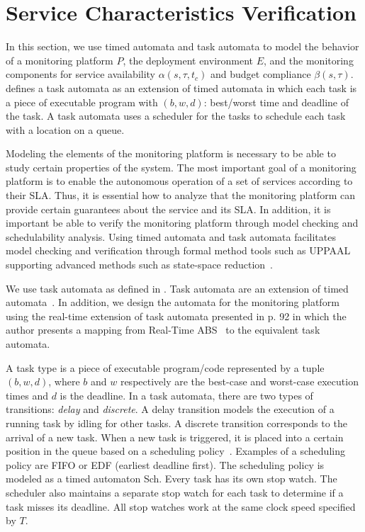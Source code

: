 
\section{Service Characteristics Verification}
\label{sec:timed:fsm}

In this section, we use timed automata and task automata to model the behavior of a monitoring platform $P$, the deployment environment $E$, and the monitoring components for service availability $\alpha(s,\tau,t_c)$ and budget compliance $\beta(s,\tau)$. 
\cite{jaghoori2010time} defines a task automata as an extension of timed automata in which each task is a piece of executable program with $(b,w,d)$: best/worst time and deadline of the task. A task automata uses a scheduler for the tasks to schedule each task with a location on a queue.
% 

Modeling the elements of the monitoring platform is necessary to be able to study certain properties of the system.
The most important goal of a monitoring platform is to enable the autonomous operation of a set of services according to their SLA.
Thus, it is essential how to analyze that the monitoring platform can provide certain guarantees about the service and its SLA.
In addition, it is important be able to verify the monitoring platform through model checking and schedulability analysis.
Using timed automata and task automata facilitates model checking and verification through formal method tools such as UPPAAL~\cite{uppaal2004} supporting advanced methods such as state-space reduction~\cite{larsen1997efficient}. 
   
We use task automata as defined in \cite{fersman2007task,jaghoori2012composing,jaghoori2010time}.
Task automata are an extension of timed automata~\cite{alur:1994:timedautomata}.
In addition, we design the automata for the monitoring platform using the real-time extension of task automata presented in \cite{jaghoori2010time} p. 92 in which the author presents a mapping from Real-Time ABS~\cite{johnsen2012modeling} to the equivalent task automata.

A task type is a piece of executable program/code represented by a tuple $(b,w,d)$, where $b$ and $w$ respectively are the best-case and worst-case execution times and $d$ is the deadline.
In a task automata, there are two types of transitions: \emph{delay} and \emph{discrete}.
A delay transition models the execution of a running task by idling for other tasks.
A discrete transition corresponds to the arrival of a new task.
When a new task is triggered, it is placed into a certain position in the queue based on a scheduling policy~\cite{Nobakht:sched,nobakht2013future}.
Examples of a scheduling policy are \textsf{FIFO} or \textsf{EDF} (earliest deadline first).
The scheduling policy is modeled as a timed automaton \textsf{Sch}.
Every task has its own stop watch.
The scheduler also maintains a separate stop watch for each task to determine if a task misses its deadline.
All stop watches work at the same clock speed specified by $T$.

